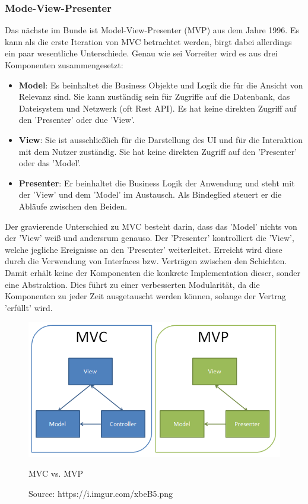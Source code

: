 \subsubsection{Mode-View-Presenter}
Das nächste im Bunde ist Model-View-Presenter (MVP) aus dem Jahre 1996.
\cite{modelViewPresenterTheTaligentMikePotel1996, modelViewPresenterMartinFowler2006}
Es kann als die erste Iteration von MVC betrachtet werden, birgt dabei allerdings ein paar wesentliche 
Unterschiede. Genau wie sei Vorreiter wird es aus drei Komponenten zusammengesetzt:

\begin{itemize}
	\item \textbf{Model}: Es beinhaltet die Business Objekte und Logik die für die Ansicht von Relevanz sind. Sie kann zuständig sein für Zugriffe auf die Datenbank, das Dateisystem und Netzwerk (oft Rest API). Es hat keine direkten Zugriff auf den 'Presenter' oder due 'View'.
	\item \textbf{View}: Sie ist ausschließlich für die Darstellung des UI und für die Interaktion mit dem Nutzer zuständig. Sie hat keine direkten Zugriff auf den 'Presenter' oder das 'Model'.
	\item \textbf{Presenter}: Er beinhaltet die Business Logik der Anwendung und steht mit der 'View' und dem 'Model' im Austausch. Als Bindeglied steuert er die Abläufe zwischen den Beiden.
\end{itemize}
Der gravierende Unterschied zu MVC besteht darin, dass das 'Model' nichts von der 'View' weiß und andersrum genauso. Der 'Presenter' kontrolliert die 'View', welche jegliche Ereignisse an den 'Presenter' weiterleitet. Erreicht wird diese durch die Verwendung von Interfaces bzw. Verträgen zwischen den Schichten. Damit erhält keine der Komponenten die konkrete Implementation dieser, sonder eine Abstraktion. Dies führt zu einer verbesserten Modularität, da die Komponenten zu jeder Zeit ausgetauscht werden können, solange der Vertrag 'erfüllt' wird.
\begin{figure}[ht]
	\centering
	\includegraphics[height=0.45\textwidth]{./images/mvp-vs-mvc.png}
	\caption{MVC vs. MVP}
	\caption*{Source: https://i.imgur.com/xbeB5.png}
	\label{fig:mvc}
\end{figure}
\clearpage

